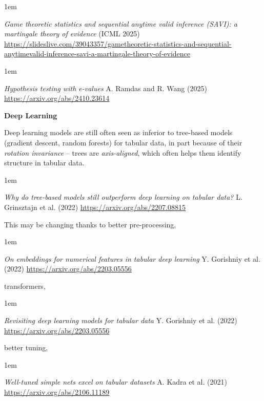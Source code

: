 \documentclass[a5paper]{article}
\newenvironment{reference}{%
  \medskip\goodbreak
  \parskip 0pt
  \raggedright
  \leftskip 1em
  \obeylines
}{\par\medskip\goodbreak}
\def\section#1{\clearpage{\vspace*{0cm}\LARGE\centering\bfseries #1\par\bigskip\bigskip}}
\def\subsection#1{{\par\bigskip\goodbreak\large\bfseries #1\par}}
\begin{document}
\begin{reference}
  \emph{Game theoretic statistics and  sequential anytime valid inference (SAVI):  a martingale theory of evidence}
  (ICML 2025)
  \url{https://slideslive.com/39043357/gametheoretic-statistics-and-sequential-anytimevalid-inference-savi-a-martingale-theory-of-evidence}
\end{reference}

\begin{reference}
  \emph{Hypothesis testing with e-values}
  A. Ramdas and R. Wang (2025)
  \url{https://arxiv.org/abs/2410.23614}
\end{reference}

\section{Tabular data}
\subsection{Deep Learning}

Deep learning models are still often seen as inferior to tree-based models
(gradient descent, random forests)
for tabular data,
in part because of their \emph{rotation invariance} --
trees are \emph{axis-aligned}, which often helps them identify structure in tabular data.

\begin{reference}
  \emph{Why do tree-based models still outperform deep learning on tabular data?}
  L. Grinsztajn et al. (2022)
  \url{https://arxiv.org/abs/2207.08815}
\end{reference}

This may be changing thanks to better pre-processing,

\begin{reference}
  \emph{On embeddings for numerical features  in tabular deep learning}
  Y. Gorishniy et al. (2022)
  \url{https://arxiv.org/abs/2203.05556}
\end{reference}

transformers,

\begin{reference}
  \emph{Revisiting deep learning models  for tabular data}
  Y. Gorishniy et al. (2022)
  \url{https://arxiv.org/abs/2203.05556}
\end{reference}

better tuning,

\begin{reference}
  \emph{Well-tuned simple nets  excel on tabular datasets}
  A. Kadra et al. (2021)
  \url{https://arxiv.org/abs/2106.11189}
\end{reference}
\end{document}
